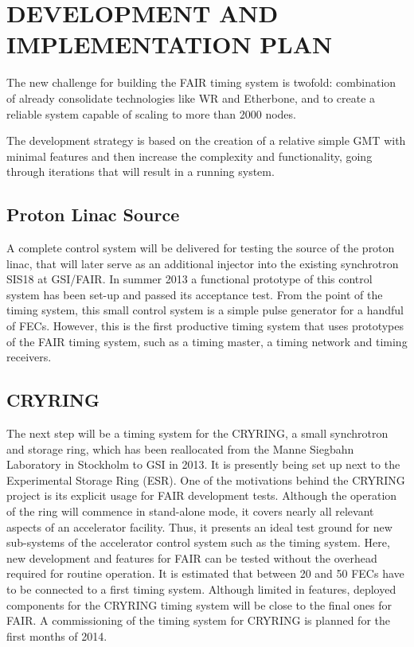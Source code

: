 \section{DEVELOPMENT AND IMPLEMENTATION PLAN}

The new challenge for building the FAIR timing system is
twofold: combination of already consolidate technologies like WR and 
Etherbone, and to create a reliable system capable of scaling
to more than 2000 nodes. 

The development strategy is based on the creation of a relative simple GMT 
with minimal features and then increase the complexity and functionality, going
through iterations that will result in a running system.

\subsection{Proton Linac Source}

A complete control system will  be delivered for testing the source of
the proton linac, that will later serve as an additional injector into
the  existing  synchrotron  SIS18  at  GSI/FAIR.   In  summer  2013  a
functional prototype of this control system has been set-up and passed
its acceptance test.  From the  point of the timing system, this small
control  system is a  simple pulse  generator for  a handful  of FECs.
However,  this  is  the  first  productive  timing  system  that  uses
prototypes  of the  FAIR timing  system, such  as a  timing  master, a
timing network and timing receivers.

\subsection{CRYRING}

 The next  step will be a  timing system
 for the CRYRING, a small  synchrotron and storage ring, which has been
 reallocated   from  the   Manne  Siegbahn   Laboratory   in  Stockholm
 \cite{CRYRING-ref} to GSI  in 2013. It is presently  being set up next
 to the Experimental Storage Ring (ESR).  One of the motivations behind
 the CRYRING project is its  explicit usage for FAIR development tests.
 Although the operation of the  ring will commence in stand-alone mode,
 it  covers nearly  all relevant  aspects of  an  accelerator facility.
 Thus,  it presents an  ideal test  ground for  new sub-systems  of the
 accelerator  control system  such  as the  timing  system.  Here,  new
 development and features  for FAIR can be tested  without the overhead
 required for routine  operation.  It is estimated that  between 20 and
 50  FECs have  to be  connected to  a first  timing  system.  Although
 limited in features, deployed components for the CRYRING timing system
 will  be close  to the  final ones  for FAIR.  A commissioning  of the
 timing system for CRYRING is planned for the first months of 2014.


